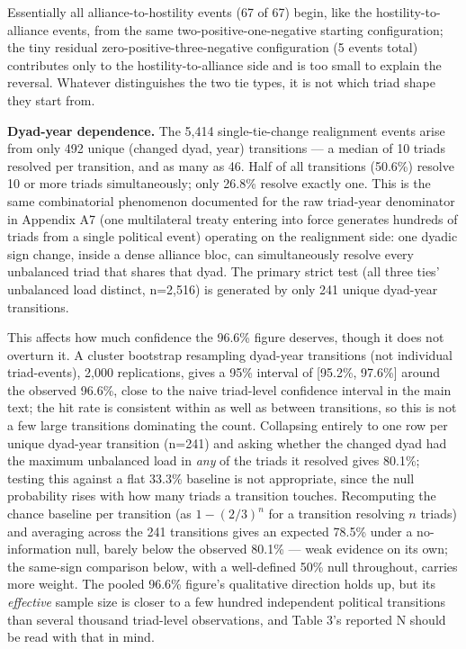 \documentclass[Afour,sageh,times,doublespace]{sagej}
\begin{document}
Essentially all alliance-to-hostility events (67 of 67) begin, like the hostility-to-alliance events, from the same two-positive-one-negative starting configuration; the tiny residual zero-positive-three-negative configuration (5 events total) contributes only to the hostility-to-alliance side and is too small to explain the reversal. Whatever distinguishes the two tie types, it is not which triad shape they start from.

\textbf{Dyad-year dependence.} The 5,414 single-tie-change realignment events arise from only 492 unique (changed dyad, year) transitions --- a median of 10 triads resolved per transition, and as many as 46. Half of all transitions (50.6\%) resolve 10 or more triads simultaneously; only 26.8\% resolve exactly one. This is the same combinatorial phenomenon documented for the raw triad-year denominator in Appendix A7 (one multilateral treaty entering into force generates hundreds of triads from a single political event) operating on the realignment side: one dyadic sign change, inside a dense alliance bloc, can simultaneously resolve every unbalanced triad that shares that dyad. The primary strict test (all three ties' unbalanced load distinct, n=2,516) is generated by only 241 unique dyad-year transitions.

This affects how much confidence the 96.6\% figure deserves, though it does not overturn it. A cluster bootstrap resampling dyad-year transitions (not individual triad-events), 2,000 replications, gives a 95\% interval of [95.2\%, 97.6\%] around the observed 96.6\%, close to the naive triad-level confidence interval in the main text; the hit rate is consistent within as well as between transitions, so this is not a few large transitions dominating the count. Collapsing entirely to one row per unique dyad-year transition (n=241) and asking whether the changed dyad had the maximum unbalanced load in \emph{any} of the triads it resolved gives 80.1\%; testing this against a flat 33.3\% baseline is not appropriate, since the null probability rises with how many triads a transition touches. Recomputing the chance baseline per transition (as $1-(2/3)^n$ for a transition resolving $n$ triads) and averaging across the 241 transitions gives an expected 78.5\% under a no-information null, barely below the observed 80.1\% --- weak evidence on its own; the same-sign comparison below, with a well-defined 50\% null throughout, carries more weight. The pooled 96.6\% figure's qualitative direction holds up, but its \emph{effective} sample size is closer to a few hundred independent political transitions than several thousand triad-level observations, and Table 3's reported N should be read with that in mind.
\end{document}
